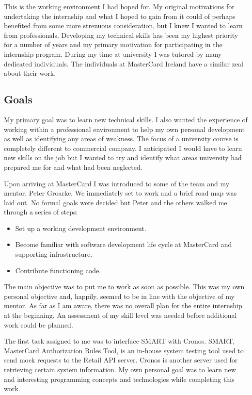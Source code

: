 \documentclass[a4paper, 11pt, titlepage]{article}
\begin{document}
This is the working environment I had hoped for. My original motivations for undertaking the internship and what I hoped to gain from it could of perhaps benefited from some more strenuous consideration, but I knew I wanted to learn from professionals. Developing my technical skills has been my highest priority for a number of years and my primary motivation for participating in the internship program. During my time at university I was tutored by many dedicated individuals. The individuals at MasterCard Ireland have a similar zeal about their work. 
 
\subsection{Goals} 
 
My primary goal was to learn new technical skills. I also wanted the experience of working within a professional environment to help my own personal development as well as identifying any areas of weakness. The focus of a university course is completely different to commercial company. I anticipated I would have to learn new skills on the job but I wanted to try and identify what areas university had prepared me for and what had been neglected. 

Upon arriving at MasterCard I was introduced to some of the team and my mentor, Peter Groarke. We immediately set to work and a brief road map was laid out. No formal goals were decided but Peter and the others walked me through a series of steps: 
\begin{itemize} 
\item Set up a working development environment. 
\item Become familiar with software development life cycle at MasterCard and supporting infrastructure. 
\item Contribute functioning code. 
\end{itemize} 
The main objective was to put me to work as soon as possible. This was my own personal objective and, happily, seemed to be in line with the objective of my mentor. As far as I am aware, there was no overall plan for the entire internship at the beginning. An assessment of my skill level was needed before additional work could be planned. 
 
The first task assigned to me was to interface SMART with Cronos. SMART, MasterCard Authorization Rules Tool, is an in-house system testing tool used to send mock requests to the Retail API server. Cronos is another server used for retrieving certain system information. My own personal goal was to learn new and interesting programming concepts and technologies while completing this work. 
 
\end{document}
